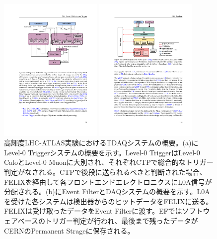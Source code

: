 \begin{figure}
\begin{minipage}[b]{.5\linewidth}
\centering
\includegraphics[height=7cm]{fig/Intro/Phase2_L0trigger.pdf}
\end{minipage}%
\begin{minipage}[b]{.5\linewidth}
\centering
\includegraphics[height=7cm]{fig/Intro/Phase2_EF.pdf}
\end{minipage}%
\caption[高輝度LHC-ATLAS実験におけるTDAQシステムの概要]{高輝度LHC-ATLAS実験におけるTDAQシステムの概要\cite{tdr_phase2tdaq_2017020}。(a)にLevel-0 Triggerシステムの概要を示す。Level-0 TriggerはLevel-0 CaloとLevel-0 Muonに大別され、それぞれCTPで総合的なトリガー判定がなされる。CTPで後段に送られるべきと判断された場合、FELIXを経由して各フロントエンドエレクトロニクスにL0A信号が分配される。(b)にEvent FilterとDAQシステムの概要を示す。L0Aを受けた各システムは検出器からのヒットデータをFELIXに送る。FELIXは受け取ったデータをEvent Filterに渡す。EFではソフトウェアベースのトリガー判定が行われ、最後まで残ったデータがCERNのPermanent Strageに保存される。}
\label{fig_formats}
\end{figure}

